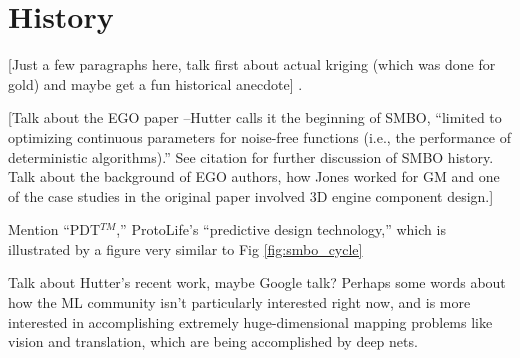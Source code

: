 \section{History}


[Just a few paragraphs here, talk first about actual kriging (which was done for gold) and maybe get a fun historical anecdote] \cite{cressie_kriging_1990}.

[Talk about the EGO paper \citep{jones_efficient_1998}--Hutter calls it the beginning of SMBO, ``limited to optimizing continuous parameters for noise-free functions (i.e., the performance of deterministic algorithms).'' \cite[p.~509]{hutter_sequential_2011} See citation for further discussion of SMBO history. Talk about the background of EGO authors, how Jones worked for GM and one of the case studies in the original paper involved 3D engine component design.]

Mention ``PDT$^{TM}$,'' ProtoLife's ``predictive design technology,'' which is illustrated by a figure very similar to Fig \ref{fig:smbo_cycle} \cite{protolife_pdt_2013}

Talk about Hutter's recent work, maybe Google talk? Perhaps some words about how the ML community isn't particularly interested right now, and is more interested in accomplishing extremely huge-dimensional mapping problems like vision and translation, which are being accomplished by deep nets.




